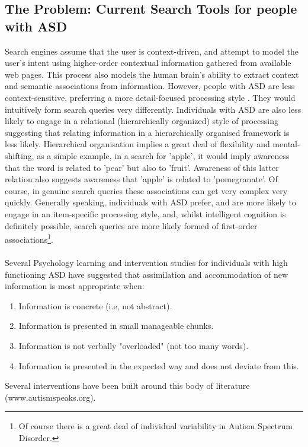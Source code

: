 \documentclass[10pt]{article}
\begin{document}
\subsection{The Problem: Current Search Tools for people with ASD}\label{the problem}
Search engines assume that the user is context-driven, and attempt to model the user's intent using higher-order contextual information gathered from available web pages. This process also models the human brain's ability to extract context and semantic associations from information. However, people with ASD are less context-sensitive, preferring a more detail-focused processing style \cite{mottron}. They would intuitively form search queries very differently. Individuals with ASD are also less likely to engage in a relational (hierarchically organized) style of processing \cite{bowler} suggesting that relating information in a hierarchically organised framework is less likely. Hierarchical organisation implies a great deal of flexibility and mental-shifting, as a simple example, in a search for 'apple', it would imply awareness that the word is related to 'pear' but also to 'fruit'. Awareness of this latter relation also suggests awareness that 'apple' is related to 'pomegranate'. Of course, in genuine search queries these associations can get very complex very quickly. Generally speaking, individuals with ASD prefer, and are more likely to engage in an item-specific processing style, and, whilst intelligent cognition is definitely possible, search queries are more likely formed of first-order associations\footnote{Of course there is a great deal of individual variability in Autism Spectrum Disorder.}. \\
\\Several Psychology learning and intervention studies for individuals with high functioning ASD have suggested that assimilation and accommodation of new information is most appropriate when:\\
\begin{enumerate}
\item Information is concrete (i.e, not abstract).
\item Information is presented in small manageable chunks.
\item Information is not verbally "overloaded" (not too many words).
\item Information is presented in the expected way and does not deviate from this.
\end{enumerate}
Several interventions have been built around this body of literature (www.autismspeaks.org).
\end{document}
